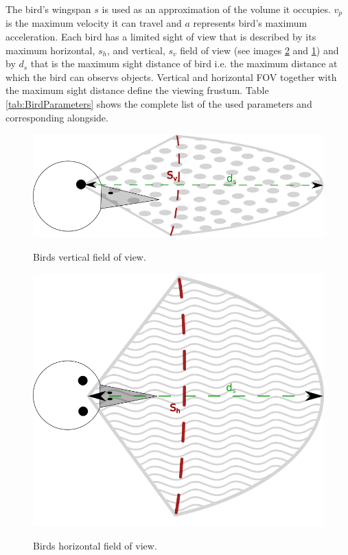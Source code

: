 The  bird's wingspan \(s\) is used as an approximation of the volume
it occupies. \(v_p\) is the maximum velocity it can travel and \(a\) represents bird's maximum acceleration.
Each bird has a limited sight of view that is described by its maximum
horizontal, \(s_h\), and vertical, \(s_v\) field of view (see images
\ref{fig:hFOV} and \ref{fig:vFOV}) and by \(d_s\) that is the maximum sight
distance of bird i.e. the maximum distance at which the bird can observs
objects.
Vertical and horizontal FOV together with the maximum sight distance define the
viewing frustum. Table \ref{tab:BirdParameters} shows the complete list of the used
parameters and corresponding alongside.


\begin{figure}
		\includegraphics[scale=0.45]{./images/verticalFow.png}
		\label{fig:vFOV}
		\caption{Birds vertical field of view.}
\end{figure}	
	
	
\begin{figure}[b]
\centering
	\includegraphics[scale=0.375]{./images/hFow.png}
	\label{fig:hFOV}
	\caption{Birds horizontal field of view.}
\end{figure}	
	




